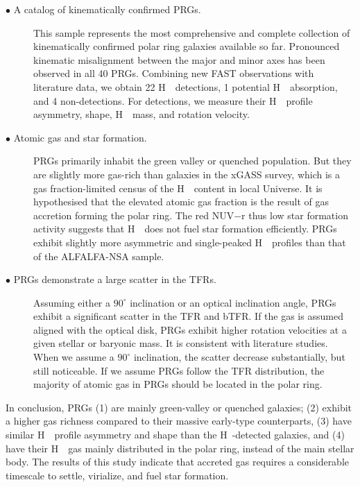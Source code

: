 \documentclass[twocolumn]{aastex631}
\def\HI{H\,  {\textsc{\romannumeral 1}}}
\begin{document}
\begin{description}
\item[$\bullet$ A catalog of kinematically confirmed PRGs.] 
This sample represents the most comprehensive and complete collection of kinematically confirmed polar ring galaxies available so far.
Pronounced kinematic misalignment between the major and minor axes has been observed in all 40 PRGs. Combining new FAST observations with literature data, we obtain 22 \HI\ detections, 1 potential \HI\ absorption, and 4 non-detections. For detections, we measure their \HI\ profile asymmetry, shape, \HI\ mass, and rotation velocity.

\item[$\bullet$ Atomic gas and star formation.] PRGs primarily inhabit the green valley or quenched population. But they are slightly more gas-rich than galaxies in the xGASS survey, which is a gas fraction-limited census of the \HI\ content in local Universe. It is hypothesised that the elevated atomic gas fraction is the result of gas accretion forming the polar ring. The red NUV$-$r thus low star formation activity suggests that \HI\ does not fuel star formation efficiently. PRGs exhibit slightly more asymmetric and single-peaked \HI\ profiles than that of the ALFALFA-NSA sample. 

\item[$\bullet$ PRGs demonstrate a large scatter in the TFRs.] Assuming either a $90^\circ$ inclination or an optical inclination angle, PRGs exhibit a significant scatter in the TFR and bTFR. If the gas is assumed aligned with the optical disk, PRGs exhibit higher rotation velocities at a given stellar or baryonic mass. It is consistent with literature studies. When we assume a $90^\circ$ inclination, the scatter decrease substantially, but still noticeable. If we assume PRGs follow the TFR distribution, the majority of atomic gas in PRGs should be located in the polar ring.   


\end{description}

In conclusion, PRGs (1) are mainly green-valley or quenched galaxies; (2) exhibit a higher gas richness compared to their massive early-type counterparts, (3) have similar \HI\ profile asymmetry and shape than the \HI-detected galaxies, and (4) have their \HI\ gas mainly distributed in the polar ring, instead of the main stellar body. The results of this study indicate that accreted gas requires a considerable timescale to settle, virialize, and fuel star formation.
\end{document}
